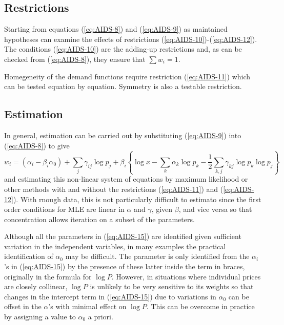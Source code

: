 \subsection{Restrictions}

Starting from equations (\ref{eq:AIDS-8}) and (\ref{eq:AIDS-9}) as maintained hypotheses can examine the effects of restrictions (\ref{eq:AIDS-10})-(\ref{eq:AIDS-12}). The conditions (\ref{eq:AIDS-10}) are the adding-up restrictions and, as can be checked from (\ref{eq:AIDS-8}), they ensure that $\sum w_i = 1$.

Homegeneity of the demand functions require restriction (\ref{eq:AIDS-11}) which can be tested equation by equation. Symmetry is also a testable restriction.

\subsection{Estimation}
\label{sec:AIDS-1.D}

In general, estimation can be carried out by substituting (\ref{eq:AIDS-9}) into (\ref{eq:AIDS-8}) to give
\begin{equation}
	\label{eq:AIDS-15}
	w_i = (\alpha_i - \beta_i\alpha_0) + \sum_j \gamma_{ij} \log p_j + \beta_i \left\{\log x - \sum_k \alpha_k \log p_k - \frac{1}{2}\sum_{k,j} \gamma_{kj} \log p_k \log p_j\right\}
\end{equation}
and estimating this non-linear system of equations by maximum likelihood or other methods with and without the restrictions (\ref{eq:AIDS-11}) and (\ref{eq:AIDS-12}). With rnough data, this is not particularly difficult to estimato since the first order conditions for MLE are linear in $\alpha$ and $\gamma$, given $\beta$, and vice versa so that concentration allows iteration on a subset of the parameters. 

Although all the parameters in (\ref{eq:AIDS-15}) are identified given sufficient variation in the independent variables, in many examples the practical identification of $\alpha_0$ may be difficult. The parameter is only identified from the $\alpha_i$'s in (\ref{eq:AIDS-15}) by the presence of these latter inside the term in braces, originally in the formula for $\log P$. However, in situations where individual prices are closely collinear, $\log P$ is unlikely to be very sensitive to its weights so that changes in the intercept term in (\ref{eq:AIDS-15}) due to variations in $\alpha_0$ can be offset in the $\alpha$'s with minimal effect on $\log P$. This can be overcome in practice by assigning a value to $\alpha_0$ a priori. 

